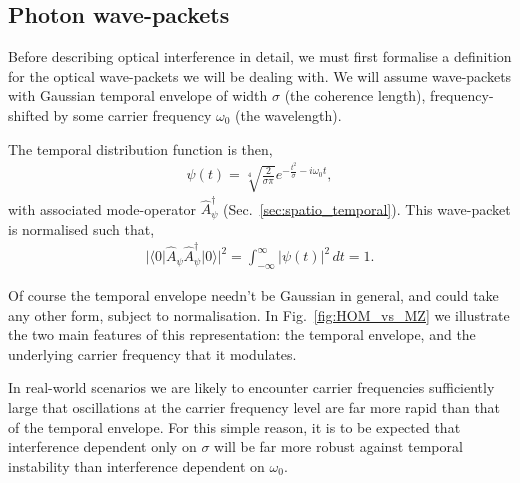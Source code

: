 \documentclass[aps, rmp, twocolumn, amsmath, amssymb, nofootinbib, superscriptaddress, longbibliography, floatfix, table-of-contents, eqsecnum]{revtex4-1}
\newcommand{\bra}[1]{\langle#1|}
\newcommand{\ket}[1]{|#1\rangle}
\begin{document}
%
%

\subsection{Photon wave-packets} 

Before describing optical interference in detail, we must first formalise a definition for the optical wave-packets we will be dealing with. We will assume wave-packets with Gaussian temporal envelope of width $\sigma$ (the coherence length), frequency-shifted by some carrier frequency $\omega_0$ (the wavelength).

The temporal distribution function is then,
\begin{align} \label{eq:wavepacket_modulated}
\psi(t) = \sqrt[4]{\frac{2}{\sigma\pi}}e^{-\frac{t^2}{\sigma}-i\omega_0t},
\end{align}
with associated mode-operator $\hat{A}^\dag_\psi$ (Sec.~\ref{sec:spatio_temporal}). This wave-packet is normalised such that,
\begin{align}
|\bra{0} \hat{A}_\psi \hat{A}_\psi^\dag \ket{0}|^2 = \int_{-\infty}^\infty |\psi(t)|^2 \, dt = 1.
\end{align}

Of course the temporal envelope needn't be Gaussian in general, and could take any other form, subject to normalisation. In Fig.~\ref{fig:HOM_vs_MZ} we illustrate the two main features of this representation: the temporal envelope, and the underlying carrier frequency that it modulates.

In real-world scenarios we are likely to encounter carrier frequencies sufficiently large that oscillations at the carrier frequency level are far more rapid than that of the temporal envelope. For this simple reason, it is to be expected that interference dependent only on $\sigma$ will be far more robust against temporal instability than interference dependent on $\omega_0$.
\end{document}
